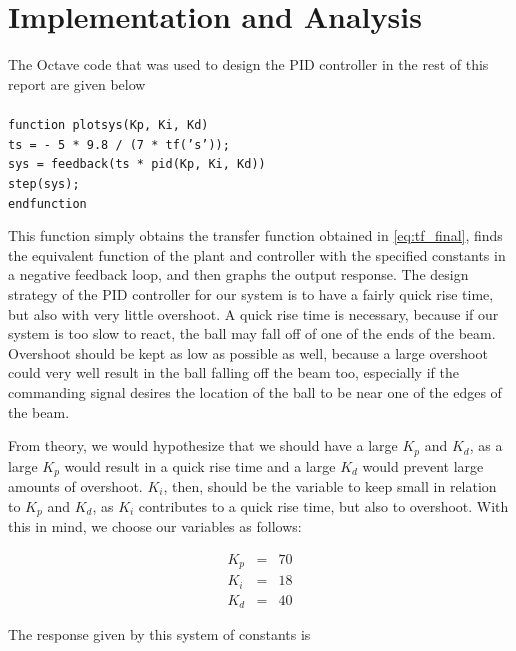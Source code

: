 \documentclass[a4paper, 12pt]{article}
\begin{document}

\section{Implementation and Analysis}
	The Octave code that was used to design the PID controller in the rest of
	this report are given below\\\\\noindent
	\texttt{function plotsys(Kp, Ki, Kd)\\\noindent
  ts = - 5 * 9.8 / (7 * tf('s'));\\\noindent
  sys = feedback(ts * pid(Kp, Ki, Kd))\\\noindent
  step(sys);\\\noindent
endfunction}

This function simply obtains the transfer function obtained in
\eqref{eq:tf_final}, finds the equivalent function of the plant and controller
with the specified constants in a negative feedback loop, and then graphs the
output response. The design strategy of the PID controller for our system is to
have a fairly quick rise time, but also with very little overshoot. A quick
rise time is necessary, because if our system is too slow to react, the ball
may fall off of one of the ends of the beam. Overshoot should be kept as low as
possible as well, because a large overshoot could very well result in the ball
falling off the beam too, especially if the commanding signal desires the
location of the ball to be near one of the edges of the beam.

From theory, we would hypothesize that we should have a large $K_p$ and $K_d$,
as a large $K_p$ would result in a quick rise time and a large $K_d$ would
prevent large amounts of overshoot. $K_i$, then, should be the variable to keep
small in relation to $K_p$ and $K_d$, as $K_i$ contributes to a quick rise
time, but also to overshoot. With this in mind, we choose our variables as
follows:

\begin{equation}
  \begin{array}{rcl}
	K_p & = & 70 \\
	K_i & = & 18 \\
	K_d & = & 40
  \end{array}
  \label{eq:pid_constants}
\end{equation}

The response given by this system of constants is
\end{document}
